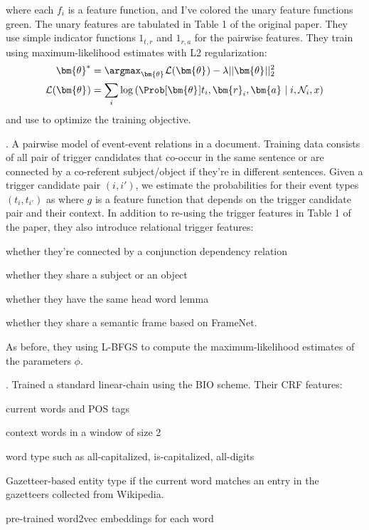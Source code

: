 \documentclass[11pt]{article}
\renewcommand\vec[2][]{\bm{#2}_{#1}}
\newcommand\myspace[1][]{\vspace{#1\bigskipamount}}
\newcommand\p{\Needspace{10\baselineskip} \noindent}
\begin{document}
where each $f_i$ is a feature function, and I've colored the unary feature functions green. The unary features are tabulated in Table 1 of the original paper. They use simple indicator functions $1_{t,r}$ and $1_{r, a}$ for the pairwise features. They train using maximum-likelihood estimates with L2 regularization:
\begin{align}
	\vec{\theta}^* &= \argmax_{\vec\theta} \mathcal{L}(\vec\theta) - \lambda ||\vec\theta||_2^2 \\
	\mathcal{L}(\vec\theta) &= \sum_i \log \left( \Prob[\vec{\theta}]{ t_i, \vec[i]{r}, \vec{a} \mid i, \mathcal{N}_i, x } \right)
\end{align}
and use  to optimize the training objective. 

\myspace
\p {}. A pairwise model of event-event relations in a document. Training data consists of all pair of trigger candidates that co-occur in the same sentence or are connected by a co-referent subject/object if they're in different sentences. Given a trigger candidate pair $(i, i')$, we estimate the probabilities for their event types $(t_i, t_{i'})$ as
where $g$ is a feature function that depends on the trigger candidate pair and their context. In addition to re-using the trigger features in Table 1 of the paper, they also introduce relational trigger features:
\begin{compactenum}
	\item whether they're connected by a conjunction dependency relation
	\item whether they share a subject or an object
	\item whether they have the same head word lemma
	\item whether they share a semantic frame based on FrameNet. 
\end{compactenum}
As before, they using L-BFGS to compute the maximum-likelihood estimates of the parameters $\phi$. 


\myspace
\p {}. Trained a standard linear-chain  using the BIO scheme. Their CRF features:
\begin{compactenum}
	\item current words and POS tags
	\item context words in a window of size 2
	\item word type such as all-capitalized, is-capitalized, all-digits
	\item Gazetteer-based entity type if the current word matches an entry in the gazetteers collected from Wikipedia. 
	\item pre-trained word2vec embeddings for each word
\end{compactenum}
\end{document}
